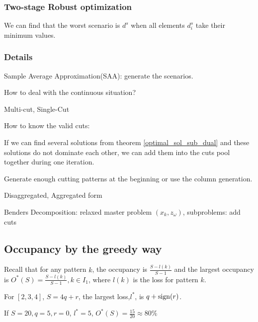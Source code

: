 \subsubsection{Two-stage Robust optimization}

We can find that the worst scenario is $d^{s}$ when all elements $d_i^{s}$ take their minimum values. 


\subsubsection{Details}

Sample Average Approximation(SAA): generate the scenarios.

How to deal with the continuous situation?

Multi-cut, Single-Cut

How to know the valid cuts:

If we can find several solutions from theorem \eqref{optimal_sol_sub_dual} and these solutions do not dominate each other, we can add them into the cuts pool together during one iteration.

Generate enough cutting patterns at the beginning or use the column generation.

Disaggregated, Aggregated form

Benders Decomposition: relaxed master problem $(x_k,z_\omega)$, subproblems: add cuts

\subsection{Occupancy by the greedy way}

Recall that for any pattern $k$, the occupancy is $\frac{S-l(k)}{S-1}$ and the largest occupancy is $O^{*}(S) = \frac{S-l(k)}{S-1}, k \in I_1$, where $l(k)$ is the loss for pattern $k$.

For $[2,3,4]$, $S = 4q + r$, the largest loss,$l^{*}$, is $q+ \operatorname{sign}(r)$.

If $S =20, q = 5, r=0$, $l^{*} = 5$, $O^{*}(S) = \frac{15}{20} \approx 80\%$

